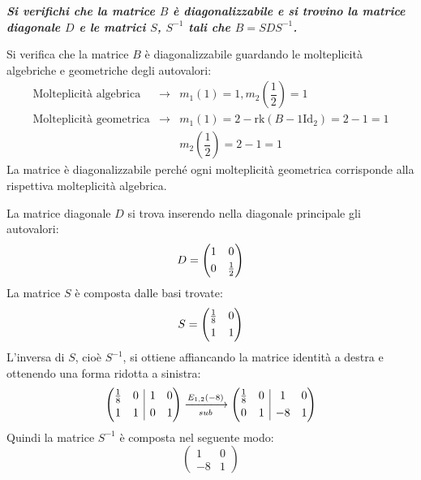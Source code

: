 \documentclass[a4paper]{article}
\makeatletter
\newenvironment{rowequmat}[1]{\left(\array{@{}#1@{}}}{\endarray\right)}
\makeatother
\begin{document}
	\textcolor{Green4}{\textbf{\emph{Si verifichi che la matrice $B$ è diagonalizzabile e si trovino la matrice diagonale $D$ e le matrici $S$, $S^{-1}$ tali che $B=SDS^{-1}$.}}}\newline

	\noindent
	Si verifica che la matrice $B$ è diagonalizzabile guardando le molteplicità algebriche e geometriche degli autovalori:
	\begin{equation*}
		\begin{array}{lll}
			\text{Molteplicità algebrica} &\longrightarrow& m_{1}\left(1\right) = 1, m_{2}\left(\dfrac{1}{2}\right) = 1 \\ [2em]
			\text{Molteplicità geometrica} &\longrightarrow& m_{1}\left(1\right) = 2 - \mathrm{rk}\left(B - 1\mathrm{Id}_{2}\right) = 2 - 1 = 1 \\ [1.5em]
			&& m_{2}\left(\dfrac{1}{2}\right) = 2 - 1 = 1
		\end{array}
	\end{equation*}
	La matrice è diagonalizzabile perché ogni molteplicità geometrica corrisponde alla rispettiva molteplicità algebrica.\newline

	\noindent
	La matrice diagonale $D$ si trova inserendo nella diagonale principale gli autovalori:
	\begin{equation*}
		D = \begin{rowequmat}{cc}
			1 & 0 \\ [.3em]
			0 & \frac{1}{2}
		\end{rowequmat}
	\end{equation*}
	La matrice $S$ è composta dalle basi trovate:
	\begin{equation*}
		S = \begin{rowequmat}{cc}
			\frac{1}{8}	& 0 \\ [.3em]
			1			& 1
		\end{rowequmat}
	\end{equation*}
	L'inversa di $S$, cioè $S^{-1}$, si ottiene affiancando la matrice identità a destra e ottenendo una forma ridotta a sinistra:
	\begin{equation*}
		\begin{rowequmat}{cc|cc}
			\frac{1}{8}	& 0 & 1 & 0 \\ [.3em]
			1			& 1 & 0 & 1
		\end{rowequmat}
		\xlongrightarrow[sub]{E_{1,2}\left(-8\right)}
		\begin{rowequmat}{cc|cc}
			\frac{1}{8}	& 0 & 1 & 0 \\ [.3em]
			0			& 1 & -8 & 1
		\end{rowequmat}
	\end{equation*}
	Quindi la matrice $S^{-1}$ è composta nel seguente modo:
	\begin{equation*}
		\begin{pmatrix}
			1 & 0 \\
			-8 & 1
		\end{pmatrix}
	\end{equation*}\newpage
\end{document}

